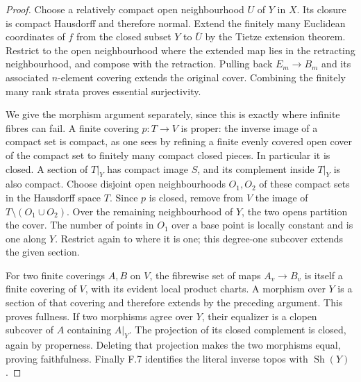 \begin{proof}
Choose a relatively compact open neighbourhood $U$ of $Y$ in
$X$. Its closure is compact Hausdorff and therefore normal.
Extend the finitely many Euclidean coordinates of $f$ from the
closed subset $Y$ to $\overline U$ by the Tietze extension
theorem. Restrict to the open neighbourhood where the extended
map lies in the retracting neighbourhood, and compose with the
retraction. Pulling back $E_m\to B_m$ and its associated
$n$-element covering extends the original cover. Combining the
finitely many rank strata proves essential surjectivity.

We give the morphism argument separately, since this is exactly
where infinite fibres can fail. A finite covering $p:T\to V$
is proper: the inverse image of a compact set is compact, as
one sees by refining a finite evenly covered open cover of
the compact set to finitely many compact closed pieces. In
particular it is closed. A section of $T|_Y$ has compact image
$S$, and its complement inside $T|_Y$ is also compact. Choose
disjoint open neighbourhoods $O_1,O_2$ of these compact sets in
the Hausdorff space $T$. Since $p$ is closed, remove from $V$
the image of $T\setminus(O_1\cup O_2)$. Over the remaining
neighbourhood of $Y$, the two opens partition the cover.
The number of points in $O_1$ over a base point is locally
constant and is one along $Y$. Restrict again to where it is
one; this degree-one subcover extends the given section.

For two finite coverings $A,B$ on $V$, the fibrewise set of
maps $A_v\to B_v$ is itself a finite covering of $V$, with
its evident local product charts. A morphism over $Y$ is a
section of that covering and therefore extends by the preceding
argument. This proves fullness. If two morphisms agree over
$Y$, their equalizer is a clopen subcover of $A$ containing
$A|_Y$. The projection of its closed complement is closed,
again by properness. Deleting that projection makes the two
morphisms equal, proving faithfulness. Finally F.7 identifies
the literal inverse topos with $\operatorname{Sh}(Y)$.
\end{proof}

